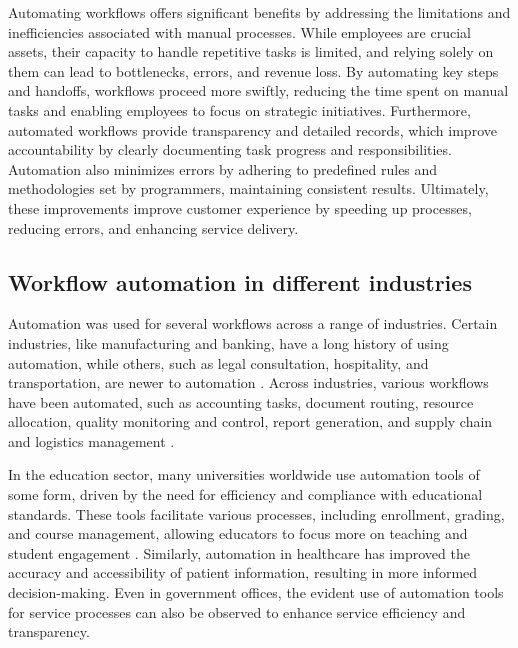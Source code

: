 Automating workflows offers significant benefits by addressing the limitations and inefficiencies associated with manual processes. While employees are crucial assets, their capacity to handle repetitive tasks is limited, and relying solely on them can lead to bottlenecks, errors, and revenue loss. By automating key steps and handoffs, workflows proceed more swiftly, reducing the time spent on manual tasks and enabling employees to focus on strategic initiatives. Furthermore, automated workflows provide transparency and detailed records, which improve accountability by clearly documenting task progress and responsibilities. Automation also minimizes errors by adhering to predefined rules and methodologies set by programmers, maintaining consistent results. Ultimately, these improvements improve customer experience by speeding up processes, reducing errors, and enhancing service delivery. 

\subsection{Workflow automation in different industries}

Automation was used for several workflows across a range of industries. Certain industries, like manufacturing and banking, have a long history of using automation, while others, such as legal consultation, hospitality, and transportation, are newer to automation \cite{caban2021}. Across industries, various workflows have been automated, such as accounting tasks, document routing, resource allocation, quality monitoring and control, report generation, and supply chain and logistics management \cite{aguirre2017, mcquilken2014}.

In the education sector, many universities worldwide use automation tools of some form, driven by the need for efficiency and compliance with educational standards. These tools facilitate various processes, including enrollment, grading, and course management, allowing educators to focus more on teaching and student engagement \cite{choudhary2024}. Similarly, automation in healthcare has improved the accuracy and accessibility of patient information, resulting in more informed decision-making. Even in government offices, the evident use of automation tools for service processes can also be observed to enhance service efficiency and transparency. 



